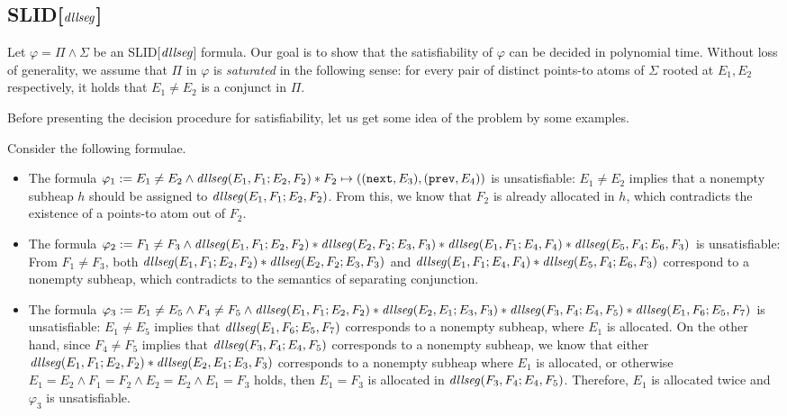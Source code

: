 \documentclass{llncs}
\begin{document}
\subsection{SLID[$\mathit{dllseg}$]}

Let $\varphi = \Pi \wedge \Sigma$ be an SLID[$\mathit{dllseg}$] formula. Our goal is to show that the satisfiability of $\varphi$ can be decided in polynomial time. Without loss of generality, we assume that $\Pi$ in $\varphi$ is \emph{saturated} in the following sense: for every pair of distinct points-to atoms of $\Sigma$ rooted at $E_1,E_2$ respectively, it holds that $E_1 \neq E_2$ is a conjunct in $\Pi$.

Before presenting the decision procedure for satisfiability, let us get some idea of the problem by some examples.

\begin{example}\label{exmp-dllseg-sat}
Consider the following formulae.
\begin{itemize}
\item The formula $\varphi_1:= E_1 \neq E_2 \wedge \mathit{dllseg}(E_1,F_1; E_2, F_2) \ast F_2 \mapsto ((\mathtt{next},E_3),(\mathtt{prev},E_4))$ is unsatisfiable: $E_1 \neq E_2$ implies that a nonempty subheap $h$ should be assigned to $\mathit{dllseg}(E_1, F_1; E_2, F_2)$. From this, we know that $F_2$ is already allocated in $h$, which contradicts the existence of a points-to atom out of $F_2$.
%
\item The formula $\varphi_2 := F_1 \neq F_3 \wedge \mathit{dllseg}(E_1, F_1; E_2, F_2) \ast  \mathit{dllseg}(E_2, F_2; E_3, F_3) \ast \mathit{dllseg}(E_1, F_1; E_4, F_4) \ast \mathit{dllseg}(E_5, F_4; E_6, F_3)$ is unsatisfiable: From $F_1 \neq F_3$,  both $\mathit{dllseg}(E_1, F_1; E_2, F_2) \ast  \mathit{dllseg}(E_2, F_2; E_3, F_3)$ and $\mathit{dllseg}(E_1, F_1; E_4, F_4) \ast \mathit{dllseg}(E_5, F_4; E_6, F_3)$ correspond to a nonempty subheap, which contradicts to the semantics of separating conjunction.
%
\item The formula $\varphi_3 := E_1 \neq E_5 \wedge F_4 \neq F_5 \wedge \mathit{dllseg}(E_1, F_1; E_2, F_2) \ast \mathit{dllseg}(E_2, E_1; E_3, F_3) \ast \mathit{dllseg}(F_3, F_4; E_4, F_5) \ast \mathit{dllseg}(E_1, F_6; E_5, F_7)$ is unsatisfiable: $E_1 \neq E_5$ implies that $\mathit{dllseg}(E_1, F_6; E_5, F_7)$ corresponds to a nonempty subheap, where $E_1$ is allocated. On the other hand, since $F_4 \neq F_5$ implies that $\mathit{dllseg}(F_3, F_4; E_4, F_5)$ corresponds to a nonempty subheap, we know that either $\mathit{dllseg}(E_1, F_1; E_2, F_2) \ast \mathit{dllseg}(E_2, E_1; E_3, F_3)$ corresponds to a nonempty subheap where $E_1$ is allocated, or otherwise $E_1 = E_2 \wedge F_1 = F_2 \wedge E_2 = E_2 \wedge E_1 = F_3$ holds, then $E_1=F_3$ is allocated in $\mathit{dllseg}(F_3, F_4; E_4, F_5)$. Therefore, $E_1$ is allocated twice and $\varphi_3$ is unsatisfiable.
\end{itemize}
\end{example}
\end{document}
